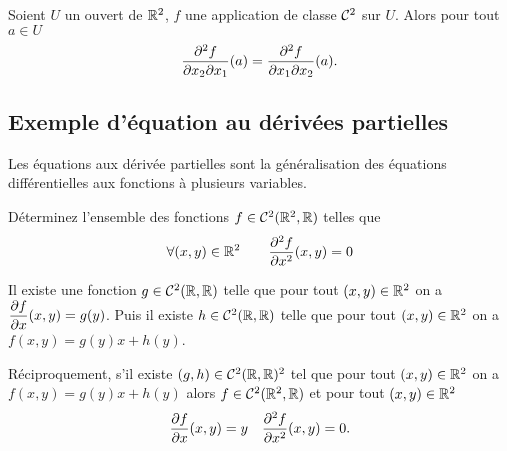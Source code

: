 \begin{theo}
  Soient $U$ un ouvert de $\mathbb{R}^2$, $f$ une application de classe $\mathcal{C}^{2}$ sur $U$. Alors pour tout $a \in U$
  \begin{equation}
    \dfrac{\partial{}^2 f}{\partial{} {x_2} \partial{} {x_1}} (a) = \dfrac{\partial{}^2 f}{\partial{} {x_1} \partial{} {x_2}} (a).
  \end{equation}
\end{theo}

\subsection{Exemple d'équation au dérivées partielles}

Les équations aux dérivée partielles sont la généralisation des équations différentielles aux fonctions à plusieurs variables.



Déterminez l'ensemble des fonctions $f \in \mathcal{C}^{2}(\mathbb{R}^2, \mathbb{R})$ telles que
\begin{equation}
  \forall (x,y) \in \mathbb{R}^2 \qquad \dfrac{\partial{}^2 f}{\partial{} {x}^2}(x, y) = 0
\end{equation}


Il existe une fonction $g \in \mathcal{C}^{2}(\mathbb{R}, \mathbb{R})$ telle que pour tout $(x, y) \in \mathbb{R}^2$ on a $\dfrac{\partial{} f}{\partial{} x}(x, y)=g(y)$. Puis il existe $h \in  \mathcal{C}^{2}(\mathbb{R}, \mathbb{R})$ telle que pour tout $(x, y) \in \mathbb{R}^2$ on a $f(x, y) = g(y)x+h(y)$.

Réciproquement, s'il existe $(g, h) \in \mathcal{C}^{2}(\mathbb{R}, \mathbb{R})^2$ tel que pour tout $(x, y) \in \mathbb{R}^2$ on a $f(x, y) = g(y)x+h(y)$ alors $f \in \mathcal{C}^{2}(\mathbb{R}^2, \mathbb{R})$ et pour tout $(x, y) \in \mathbb{R}^2$
\begin{equation}
  \dfrac{\partial{} f}{\partial{} x}(x,y)=y \quad   \dfrac{\partial{}^2 f}{\partial{} {x}^2}(x,y)=0.
\end{equation}

